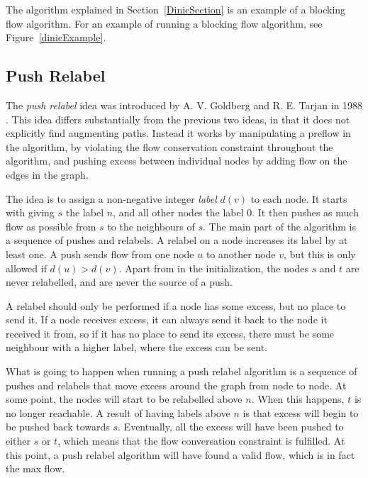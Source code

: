 The algorithm explained in Section~\ref{DinicSection} is an example of a blocking flow algorithm.
For an example of running a blocking flow algorithm, see Figure~\ref{dinicExample}.


\subsection{Push Relabel}

The \emph{push relabel} idea was introduced by A. V. Goldberg and R. E. Tarjan in 1988 \cite{Goldberg1988}.
This idea differs substantially from the previous two ideas, in that it does not explicitly find augmenting paths.
Instead it works by manipulating a preflow in the algorithm, by violating the flow conservation constraint throughout the algorithm, and pushing excess between individual nodes by adding flow on the edges in the graph.

The idea is to assign a non-negative integer \emph{label} $d(v)$ to each node. 
It starts with giving $s$ the label $n$, and all other nodes the label $0$. 
It then pushes as much flow as possible from $s$ to the neighbours of $s$. The main part of the algorithm is a sequence of pushes and relabels. 
A relabel on a node increases its label by at least one. 
A push sends flow from one node $u$ to another node $v$, but this is only allowed if $d(u) > d(v)$. 
Apart from in the initialization, the nodes $s$ and $t$ are never relabelled, and are never the source of a push.

A relabel should only be performed if a node has some excess, but no place to send it. 
If a node receives excess, it can always send it back to the node it received it from, so if it has no place to send its excess, there must be some neighbour with a higher label, where the excess can be sent.

What is going to happen when running a push relabel algorithm is a sequence of pushes and relabels that move excess around the graph from node to node.
At some point, the nodes will start to be relabelled above $n$. 
When this happens, $t$ is no longer reachable.
A result of having labels above $n$ is that excess will  begin to be pushed back towards $s$. 
Eventually, all the excess will have been pushed to either $s$ or $t$, which means that the flow conversation constraint is fulfilled. 
At this point, a push relabel algorithm will have found a valid flow, which is in fact the max flow.

